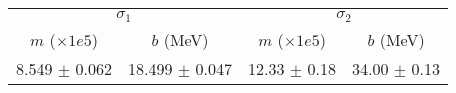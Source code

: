 \begin{tabular}{cc|cc}
\multicolumn{2}{c|}{$\sigma_1$} & \multicolumn{2}{|c}{$\sigma_2$} \\
$m$ ($\times1e5$) & $b$ (MeV) & $m$ ($\times1e5$) & $b$ (MeV) \\
\hline
8.549 $\pm$ 0.062 & 18.499 $\pm$ 0.047 & 12.33 $\pm$ 0.18 & 34.00 $\pm$ 0.13\\
\end{tabular}
